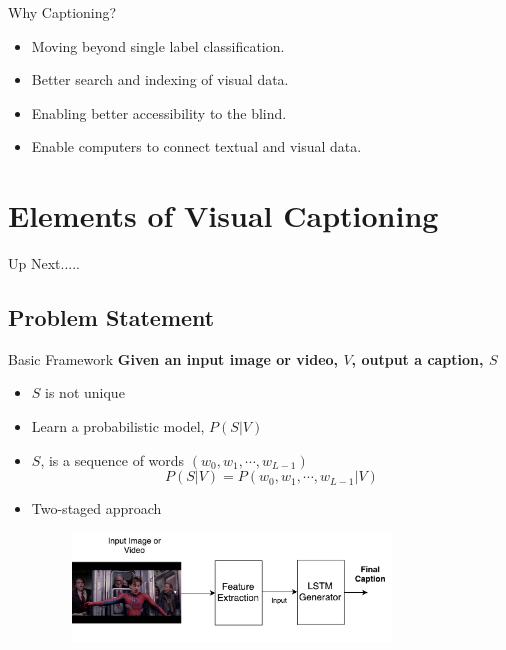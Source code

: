 \documentclass{beamer}
\begin{document}
\begin{frame}{Why Captioning?}
\begin{itemize}
\item Moving beyond single label classification.
\item Better search and indexing of visual data.
\item Enabling better accessibility to the blind.
\item Enable computers to connect textual and visual data. 
\end{itemize}
\end{frame}

\section{Elements of Visual Captioning}
\begin{frame}{Up Next.....}
\tableofcontents[currentsection] 
\end{frame}
\subsection{Problem Statement}
\begin{frame}{Basic Framework}
\textbf{Given an input image or video, $V$, output a caption, $S$}
\begin{itemize}
\item $S$ is not unique
\item Learn a probabilistic model, $P(S|V)$
\item $S$, is a sequence of words $(w_0, w_1,\cdots, w_{L-1})$
\begin{equation}
\label{eq:langB1} P(S|V) = P(w_0, w_1, \cdots, w_{L-1}|V)
\end{equation}
\item Two-staged approach
    {
        \begin{figure}[h]
            \centering
            \includegraphics[width=0.8\textwidth]{images/Thesis_generalBaseline.pdf}
        \end{figure}
     }
\end{itemize} 
\end{frame}
\end{document}
